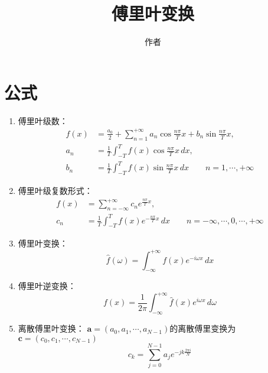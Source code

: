\documentclass[12pt,a4paper]{article}
\title{傅里叶变换}
\author{作者}
\date{\chntoday}
\begin{document}
\maketitle
\newpage
\section{公式}
\begin{enumerate}[1.]
\item 傅里叶级数：
\begin{align*}
f(x)&=\frac{a_0}{2}+\sum_{n=1}^{+\infty}{a_n\cos{\frac{n\pi}{T}x}+b_n\sin{\frac{n\pi}{T}x}},\\
a_n&=\frac{1}{T}\int_{-T}^{T}{f(x)\cos{\frac{n\pi}{T}x}}\,dx,\\
b_n&=\frac{1}{T}\int_{-T}^{T}{f(x)\sin{\frac{n\pi}{T}x}}\,dx\qquad n=1,\cdots,+\infty
\end{align*}
\item 傅里叶级复数形式：
\begin{align*}
f(x)&=\sum_{n=-\infty}^{+\infty}{c_n e^{\frac{n\pi}{T}x}},\\
c_n&=\frac{1}{T}\int_{-T}^{T}{f(x)e^{-\frac{n\pi}{T}x}}\,dx\qquad n=-\infty,\cdots,0,\cdots,+\infty
\end{align*}
\item 傅里叶变换：
$$
\hat{f}(\omega)=\int_{-\infty}^{+\infty}{f(x)e^{-i\omega x}}\,dx
$$
\item 傅里叶逆变换：
$$
f(x)=\frac{1}{2\pi}\int_{-\infty}^{+\infty}{\hat{f}(x)e^{i\omega x}}\,d\omega
$$
\item 离散傅里叶变换：
$\boldsymbol{a}=(a_0,a_1,\cdots,a_{N-1})$的离散傅里变换为$\boldsymbol{c}=(c_0,c_1,\cdots,c_{N-1})$
$$
c_k=\sum_{j=0}^{N-1}{a_j e^{-jk\frac{2\pi i}{N}}}
$$
\end{enumerate}
\end{document}

